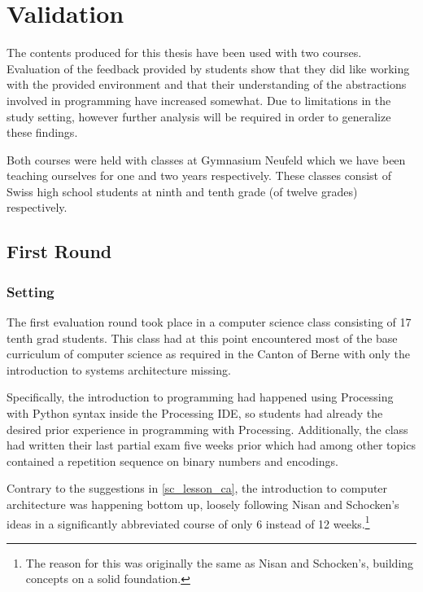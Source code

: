 
\chapter{Validation} \label{ch_practice}

The contents produced for this thesis have been used with two courses. Evaluation of the feedback provided by students show that they did like working with the provided environment and that their understanding of the abstractions involved in programming have increased somewhat. Due to limitations in the study setting, however further analysis will be required in order to generalize these findings.

Both courses were held with classes at Gymnasium Neufeld which we have been teaching ourselves for one and two years respectively. These classes consist of Swiss high school students at ninth and tenth grade (of twelve grades) respectively.


\section{First Round} \label{sc_validation_ca} %

\subsection{Setting}

The first evaluation round took place in a computer science class consisting of 17 tenth grad students. This class had at this point encountered most of the base curriculum of computer science as required in the Canton of Berne \cite[p.\,145--146]{Erz16} with only the introduction to systems architecture missing.

Specifically, the introduction to programming had happened using Processing with Python syntax inside the Processing \ac{IDE}, so students had already the desired prior experience in programming with Processing. Additionally, the class had written their last partial exam five weeks prior which had among other topics contained a repetition sequence on binary numbers and encodings.

Contrary to the suggestions in \ref{sc_lesson_ca}, the introduction to computer architecture was happening bottom up, loosely following Nisan and Schocken's ideas \cite{Nis21} in a significantly abbreviated course of only 6 instead of 12 weeks.\footnote{The reason for this was originally the same as Nisan and Schocken's, \ie building concepts on a solid foundation.}

